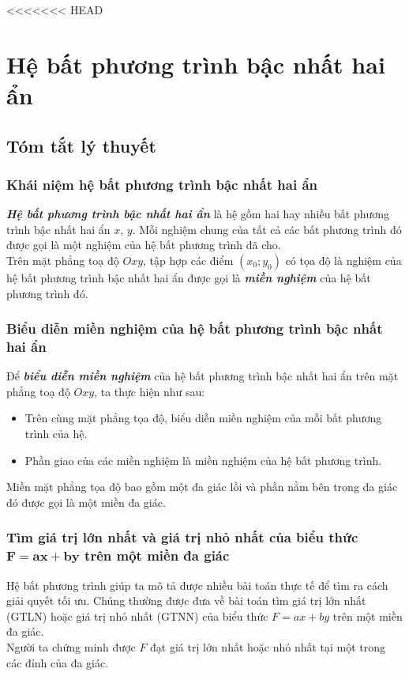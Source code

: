 <<<<<<< HEAD
\section{Hệ bất phương trình bậc nhất hai ẩn}
\setcounter{dang}{0}
\subsection{Tóm tắt lý thuyết}
\subsubsection{Khái niệm hệ bất phương trình bậc nhất hai ẩn}
\begin{boxdn}
	\textbf{\textit{Hệ bất phương trình bậc nhất hai ẩn}} là hệ gồm hai hay nhiều bất phương trình bậc nhất hai ẩn $x$, $y$. Mỗi nghiệm chung của tất cả các bất phương trình đó được gọi là một nghiệm của hệ bất phương trình đã cho.\\
	Trên mặt phẳng toạ độ $Oxy$, tập hợp các điểm $(x_0;y_0)$ có tọa độ là nghiệm của hệ bất phương trình bậc nhất hai ẩn được gọi là \textbf{\textit{miền nghiệm}} của hệ bất phương trình đó.
\end{boxdn}
\subsubsection{Biểu diễn miền nghiệm của hệ bất phương trình bậc nhất hai ẩn}
\begin{boxdn}
	Để \textbf{\textit{biểu diễn miền nghiệm}} của hệ bất phương trình bậc nhất hai ẩn trên mặt phẳng toạ độ $Oxy$, ta thực hiện như sau:
	\begin{itemize}
	\item Trên cùng mặt phẳng tọa độ, biểu diễn miền nghiệm của mỗi bất phương trình của hệ.
	\item Phần giao của các miền nghiệm là miền nghiệm của hệ bất phương trình.
	\end{itemize}
\end{boxdn}
\begin{note}
	Miền mặt phẳng tọa độ bao gồm một đa giác lồi và phần nằm bên trong đa giác đó được gọi là một miền đa giác.
\end{note}
\subsubsection{Tìm giá trị lớn nhất và giá trị nhỏ nhất của biểu thức $\mathbf{F=ax+by}$ trên một miền đa giác}
Hệ bất phương trình giúp ta mô tả được nhiều bài toán thực tế để tìm ra cách giải quyết tối ưu. Chúng thường được đưa về bài toán tìm giá trị lớn nhất (GTLN) hoặc giá trị nhỏ nhất (GTNN) của biểu thức $F=ax+by$ trên một miền đa giác.\\
Người ta chứng minh được $F$ đạt giá trị lớn nhất hoặc nhỏ nhất tại một trong các đỉnh của đa giác.
